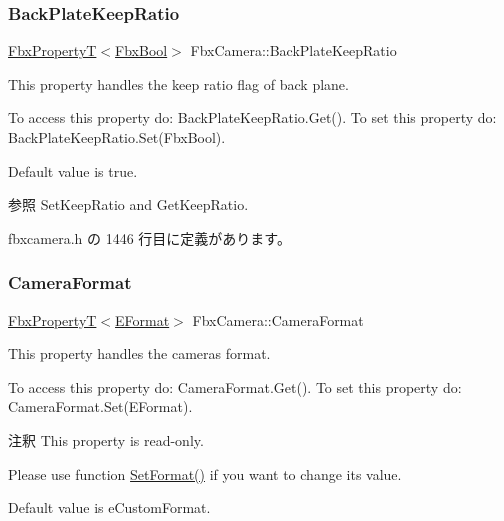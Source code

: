 \mbox{\label{class_fbx_camera_a4ee8a7a4e0c74fe8b76e83ee572a9b7c}} 
\subsubsection{\texorpdfstring{Back\+Plate\+Keep\+Ratio}{BackPlateKeepRatio}}
{\footnotesize\ttfamily \hyperlink{class_fbx_property_t}{Fbx\+PropertyT}$<$\hyperlink{fbxtypes_8h_a92e0562b2fe33e76a242f498b362262e}{Fbx\+Bool}$>$ Fbx\+Camera\+::\+Back\+Plate\+Keep\+Ratio}

This property handles the keep ratio flag of back plane.

To access this property do\+: Back\+Plate\+Keep\+Ratio.\+Get(). To set this property do\+: Back\+Plate\+Keep\+Ratio.\+Set(\+Fbx\+Bool).

Default value is true. \begin{DoxySeeAlso}{参照}
Set\+Keep\+Ratio and Get\+Keep\+Ratio. 
\end{DoxySeeAlso}


 fbxcamera.\+h の 1446 行目に定義があります。

\mbox{\label{class_fbx_camera_aa597919c9a693becd2647b969604e401}} 
\subsubsection{\texorpdfstring{Camera\+Format}{CameraFormat}}
{\footnotesize\ttfamily \hyperlink{class_fbx_property_t}{Fbx\+PropertyT}$<$\hyperlink{class_fbx_camera_a88d68c983d21e4d6c0f281a8a30f0a06}{E\+Format}$>$ Fbx\+Camera\+::\+Camera\+Format}

This property handles the camera\textquotesingle{}s format.

To access this property do\+: Camera\+Format.\+Get(). To set this property do\+: Camera\+Format.\+Set(\+E\+Format).

\begin{DoxyRemark}{注釈}
This property is read-\/only. 

Please use function \hyperlink{class_fbx_camera_a49db13fb34e3cfa618823e61511f5312}{Set\+Format()} if you want to change its value.
\end{DoxyRemark}
Default value is e\+Custom\+Format. 


